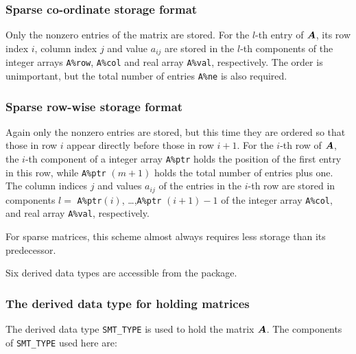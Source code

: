 \documentclass{galahad}
\begin{document}
\subsubsection{Sparse co-ordinate storage format}\label{coordinate}
Only the nonzero entries of the matrix are stored. For the 
$l$-th entry of ${\bm{A}}$, its row index $i$, column index $j$ 
and value $a_{ij}$
are stored in the $l$-th components of the integer arrays {\tt A\%row}, 
{\tt A\%col} and real array {\tt A\%val}, respectively.
The order is unimportant, but the total
number of entries {\tt A\%ne} is also required. 

\subsubsection{Sparse row-wise storage format}\label{rowwise}
Again only the nonzero entries are stored, but this time
they are ordered so that those in row $i$ appear directly before those
in row $i+1$. For the $i$-th row of ${\bm{A}}$, the $i$-th component of a 
integer array {\tt A\%ptr} holds the position of the first entry in this row,
while {\tt A\%ptr} $(m+1)$ holds the total number of entries plus one.
The column indices $j$ and values $a_{ij}$ of the entries in the $i$-th row 
are stored in components 
$l =$ {\tt A\%ptr}$(i)$, \ldots ,{\tt A\%ptr} $(i+1)-1$ of the 
integer array {\tt A\%col}, and real array {\tt A\%val}, respectively. 

For sparse matrices, this scheme almost always requires less storage than 
its predecessor.








\galtypes
Six derived data types are accessible from the package.


\subsubsection{The derived data type for holding matrices}\label{typesmt}
The derived data type {\tt SMT\_TYPE} is used to hold the matrix ${\bm{A}}$.
The components of {\tt SMT\_TYPE} used here are:
\end{document}
